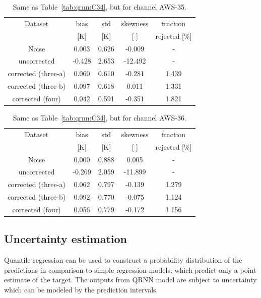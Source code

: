 \documentclass[12pt]{article}
\begin{document}
\begin{table}[!p]
	\centering
	\begin{tabular}[b]{c|c|c|c|c}
	Dataset  		  &   bias &   std &   skewness & fraction  \\
	&   [K]  &   [K] & [-] & rejected [\%]\\
		\hline

Noise                      &  0.003 & 0.626 &             -0.009 &      - \\
uncorrected                & -0.428 & 2.653 &            -12.492 &      - \\
corrected (three-a) 	   &  0.060 & 0.610 &             -0.281 &      1.439 \\
corrected (three-b) 	   &  0.097 & 0.618 &              0.011 &      1.331 \\
corrected (four)   		   &  0.042 & 0.591 &             -0.351 &      1.821 \\
	\hline
	\end{tabular}
	\caption{ Same as Table~\ref{tab:qrnn:C34}, but for channel AWS-35.}
	\label{tab:qrnn:C35}
\end{table}


\begin{table}[!p]
	\centering
	\begin{tabular}[b]{c|c|c|c|c}
	Dataset  		  &   bias &   std &   skewness & fraction  \\
	&   [K]  &   [K] & [-] & rejected [\%]\\
		\hline
Noise                       &  0.000 & 0.888  &              0.005 &      - \\
uncorrected                 & -0.269 & 2.059 &            -11.899 &      - \\
corrected (three-a) 		&  0.062 & 0.797 &             -0.139 &      1.279 \\
corrected (three-b) 		&  0.092 & 0.770 &             -0.075 &      1.124 \\
corrected (four)   			&  0.056 & 0.779 &             -0.172 &      1.156 \\


		\hline
	\end{tabular}
	\caption{ Same as Table~\ref{tab:qrnn:C34}, but for channel AWS-36.}
	\label{tab:qrnn:C36}
\end{table}

\subsection{Uncertainty estimation}
%
Quantile regression can be used to construct a probability distribution of the predictions in comparison to simple regression models, which predict only a point estimate of the target. The outputs from QRNN model are subject to uncertainty which can be modeled by the prediction intervals. 
\end{document}
